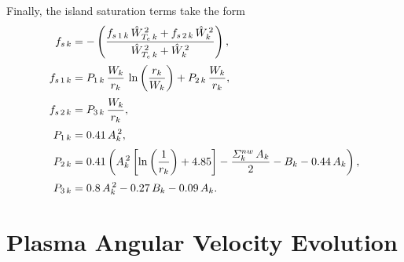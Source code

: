 \documentclass[notitlepage,12pt]{article}
\begin{document}
Finally, the island saturation terms take the form 
\begin{align}
f_{s\,k} &=-\left(\frac{f_{s\,1\,k} \,\hat{W}_{T_e\,k}^{\,2}+ f_{s\,2\,k} \,\hat{W}_k^{\,2}}{\hat{W}_{T_e\,k}^{\,2}+ \hat{W}_k^{\,2}}\right),\\[0.5ex]
f_{s\,1\,k} &= P_{1\,k}\,\frac{W_k}{r_k}\,\ln\left(\frac{r_k}{W_k}\right)+ P_{2\,k}\,\frac{W_k}{r_k},\\[0.5ex]
f_{s\,2\,k} &= P_{3\,k}\,\frac{W_k}{r_k},\\[0.5ex]
P_{1\,k} &= 0.41\,A_k^{\,2},\\[0.5ex]
P_{2\,k} &= 0.41\left(A_k^{\,2}\left[\ln\left(\frac{1}{r_k}\right)+4.85\right] - \frac{{\mit\Sigma}_k^{nw}\,A_k}{2} - B_k - 0.44\,A_k\right),\\[0.5ex]
P_{3\,k} &= 0.8\,A_k^{\,2} - 0.27\,B_k-0.09\,A_k.
\end{align}


\section{Plasma Angular Velocity Evolution}\label{a4}
\end{document}
